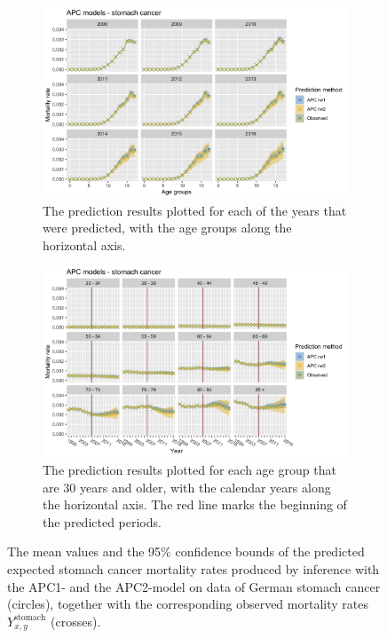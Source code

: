 \begin{figure}[h!]
    \centering
    \begin{subfigure}[b]{.75\linewidth}
        \includegraphics[width=\linewidth]{real-data/real-data-univariate/Figures/univariate-APC-by-age-stomach.png}
        \caption{The prediction results plotted for each of the years that were predicted, with the age groups along the horizontal axis.}
        \label{fig:uv-APC-stomach-top}
    \end{subfigure}
    
    \begin{subfigure}[b]{.75\linewidth}
        \includegraphics[width=\linewidth]{real-data/real-data-univariate/Figures/univariate-APC-by-period-stomach.png}
        \caption{The prediction results plotted for each age group that are 30 years and older, with the calendar years along the horizontal axis. The red line marks the beginning of the predicted periods.}
        \label{fig:uv-APC-stomach-bottom}
    \end{subfigure}
    \caption{The mean values and the 95\% confidence bounds of the predicted expected stomach cancer mortality rates produced by inference with the APC1- and the APC2-model on data of German stomach cancer (circles), together with the corresponding observed mortality rates $Y_{x,y}^{\text{stomach}}$ (crosses).}
    \label{fig:uv-APC-stomach}
\end{figure}

